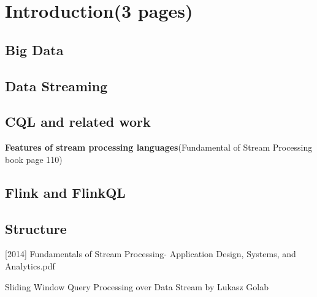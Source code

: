 
\chapter{Introduction(3 pages)}

\ifpdf
    \graphicspath{{Chapter1/Figs/Raster/}{Chapter1/Figs/PDF/}{Chapter1/Figs/}}
\else
    \graphicspath{{Chapter1/Figs/Vector/}{Chapter1/Figs/}}
\fi

\section*{Big Data}
\section*{Data Streaming}
\section*{CQL and related work}
\textbf{Features of stream processing languages}(Fundamental of Stream Processing book page 110)


\section*{Flink and FlinkQL}
\section*{Structure}


[2014] Fundamentals of Stream Processing- Application Design, Systems, and Analytics.pdf \citep{Henrique:2014}




Sliding Window Query Processing over Data Stream 
by
Lukasz Golab


